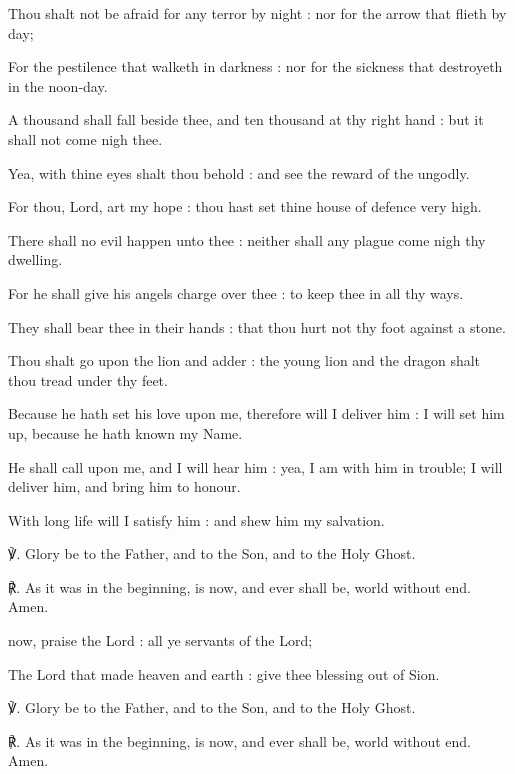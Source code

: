 \begin{multicols}{2}
Thou shalt not be afraid for any terror by night : nor for the arrow that flieth by day;\par
{}For the pestilence that walketh in darkness : nor for the sickness that destroyeth in the noon-day.\par
{}A thousand shall fall beside thee, and ten thousand at thy right hand : but it shall not come nigh thee.\par
{}Yea, with thine eyes shalt thou behold : and see the reward of the ungodly.\par
{}For thou, Lord, art my hope : thou hast set thine house of defence very high.\par
{}There shall no evil happen unto thee : neither shall any plague come nigh thy dwelling.\par
{}For he shall give his angels charge over thee : to keep thee in all thy ways.\par
{}They shall bear thee in their hands : that thou hurt not thy foot against a stone.\par
{}Thou shalt go upon the lion and adder : the young lion and the dragon shalt thou tread under thy feet.\par
{}Because he hath set his love upon me, therefore will I deliver him : I will set him up, because he hath known my Name.\par
{}He shall call upon me, and I will hear him : yea, I am with him in trouble; I will deliver him, and bring him to honour.\par
{}With long life will I satisfy him : and shew him my salvation.\par
℣. Glory be to the Father, and to the Son, and to the Holy Ghost.\par
℟. As it was in the beginning, is now, and ever shall be, world without end. Amen.
\par
{}
 now, praise the Lord : all ye servants of the Lord;\par
{}
The Lord that made heaven and earth : give thee blessing out of Sion.\par
℣. Glory be to the Father, and to the Son, and to the Holy Ghost.\par
℟. As it was in the beginning, is now, and ever shall be, world without end. Amen.

\end{multicols}
